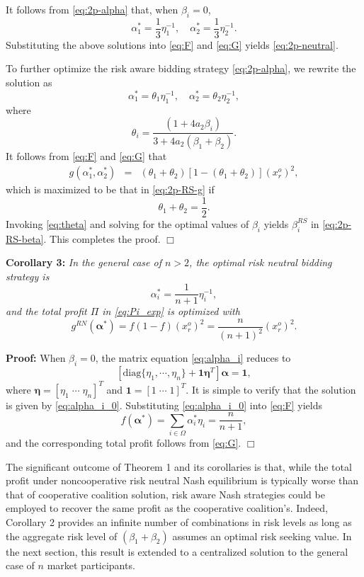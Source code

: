 \documentclass[journal]{IEEEtran}
\newcommand{\one}{\mathbf{1}}
\begin{document}
It follows from \eqref{eq:2p-alpha} that, when $\beta_i=0$,
\[ \alpha_1^* = \frac{1}{3}\eta_1^{-1}, \quad \alpha_2^* = \frac{1}{3}\eta_2^{-1}. \]
Substituting the above solutions into \eqref{eq:F} and \eqref{eq:G} yields \eqref{eq:2p-neutral}.

To further optimize the risk aware bidding strategy \eqref{eq:2p-alpha}, we rewrite the solution as
\[ \alpha_1^* = \theta_1 \eta_1^{-1}, \quad \alpha_2^* = \theta_2\eta_2^{-1}, \]
where 
\begin{equation}
    \theta_i = \frac{(1+4a_2\beta_i)}{3+4a_2(\beta_1+\beta_2)}. \label{eq:theta}
\end{equation} 
It follows from \eqref{eq:F} and \eqref{eq:G} that 
\begin{eqnarray*}
    g(\alpha_1^*, \alpha_2^*) & = & (\theta_1+\theta_2) [1- (\theta_1+\theta_2)] (x_r^o)^2, 
\end{eqnarray*}
which is maximized to be that in \eqref{eq:2p-RS-g} if
\[ \theta_1+\theta_2=\frac{1}{2}. \]
Invoking \eqref{eq:theta} and solving for the optimal values of $\beta_i$ yields $\beta_i^{RS}$ in \eqref{eq:2p-RS-beta}. This completes the proof. \hfill $\Box$

\noindent  \textbf{Corollary 3:} {\it In the general case of $n>2$, the optimal risk neutral bidding strategy is
\begin{equation}
    \alpha_i^* = \frac{1}{n+1}\eta_i^{-1},\label{eq:alpha_i_0} 
\end{equation} 
and the total profit $\Pi$ in \eqref{eq:Pi_exp} is optimized with
\[ g^{RN}(\boldsymbol{\alpha}^*)=f(1-f)(x_r^o)^2=\frac{n}{(n+1)^2} (x_r^o)^2. \]}

\noindent \textbf{Proof:} When $\beta_i=0$, the matrix equation \eqref{eq:alpha_i} reduces to 
\[ \left[\mbox{diag}\{\eta_1,\cdots,\eta_n\} + \one \boldsymbol{\eta}^T \right] \boldsymbol{\alpha}=\one, \]
where $\boldsymbol{\eta}=[\eta_1 \; \cdots \; \eta_n]^T$ and $\one=[1 \; \cdots \; 1]^T$. It is simple to verify that the solution is given by \eqref{eq:alpha_i_0}. Substituting \eqref{eq:alpha_i_0} into \eqref{eq:F} yields 
\begin{equation}
f(\boldsymbol{\alpha}^*)=\sum_{i\in\Omega}\alpha_i^*\eta_i=\frac{n}{n+1}, \label{eq:f_RN_0}
\end{equation}
and the corresponding total profit follows from \eqref{eq:G}.  \hfill $\Box$

The significant outcome of Theorem 1 and its corollaries is that, while the total profit under noncooperative risk neutral Nash equilibrium is typically worse than that of cooperative coalition solution, risk aware Nash strategies
could be employed to recover the same profit as the cooperative coalition's. Indeed, Corollary 2 provides an infinite number of combinations in risk levels as long as the aggregate risk level of $(\beta_1+\beta_2)$ assumes an optimal risk seeking value. In the next section, this result is extended to a centralized solution to the general case of $n$ market participants. 
\end{document}
